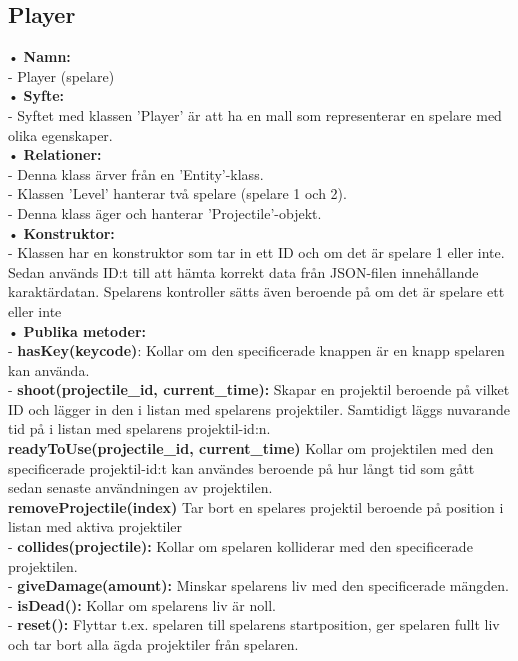 \documentclass{TDP003mall}
\begin{document}
\subsection{Player}
• \textbf{Namn:} \\
\indent- Player (spelare) \\
• \textbf{Syfte:} \\
\indent- Syftet med klassen 'Player' är att ha en mall som representerar en spelare med olika egenskaper.
\\
• \textbf{Relationer:} \\
\indent- Denna klass ärver från en 'Entity'-klass. \\
\indent- Klassen 'Level' hanterar två spelare (spelare 1 och 2). \\
\indent- Denna klass äger och hanterar 'Projectile'-objekt. \\
• \textbf{Konstruktor:} \\
\indent- Klassen har en konstruktor som tar in ett ID och om det är spelare 1 eller inte. Sedan används ID:t till att hämta korrekt data från JSON-filen innehållande karaktärdatan. Spelarens kontroller sätts även beroende på om det är spelare ett eller inte \\
• \textbf{Publika metoder:} \\
\indent- \textbf{hasKey(keycode)}: Kollar om den specificerade knappen är en knapp spelaren kan använda. \\
\indent- \textbf{shoot(projectile\_id, current\_time):} Skapar en projektil beroende på vilket ID och lägger in den i listan med spelarens projektiler. Samtidigt läggs nuvarande tid på i listan med spelarens projektil-id:n. \\
\indent \textbf{readyToUse(projectile\_id, current\_time)} Kollar om projektilen med den specificerade projektil-id:t kan användes beroende på hur långt tid som gått sedan senaste användningen av projektilen. \\
\indent \textbf{removeProjectile(index)} Tar bort en spelares projektil beroende på position i listan med aktiva projektiler \\
\indent- \textbf{collides(projectile):} Kollar om spelaren kolliderar med den specificerade projektilen. \\
\indent- \textbf{giveDamage(amount):} Minskar spelarens liv med den specificerade mängden. \\
\indent- \textbf{isDead():} Kollar om spelarens liv är noll.\\
\indent- \textbf{reset():} Flyttar t.ex. spelaren till spelarens startposition, ger spelaren fullt liv och tar bort alla ägda projektiler från spelaren.\\
\end{document}
